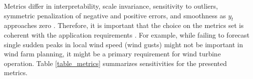 Metrics differ in interpretability, scale invariance, sensitivity to outliers, symmetric penalization of negative and positive errors, and smoothness as $y_t$ approaches zero \cite{hyndman2006metrics}. Therefore, it is important that the choice on the metrics set is coherent with the application requirements \cite{armstrong2002principles}. For example, while failing to forecast single sudden peaks in local wind speed (wind gusts) might not be important in wind farm planning, it might be a primary requirement for wind turbine operation.
Table \ref{table_metrics} summarizes sensitivities for the presented metrics.
\begin{table}[h]
    \centering
    \caption{Forecasting accuracy metrics and their sensitivities to scale and outliers.}
    \label{table_metrics}
\end{table}
